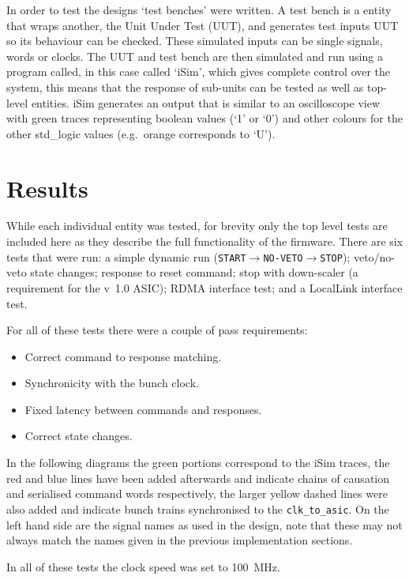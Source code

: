 In order to test the designs `test benches' were written. A test bench is a entity that wraps another, the Unit Under Test (UUT), and generates test inputs UUT so its behaviour can be checked. These simulated inputs can be single signals, words or clocks. The UUT and test bench are then simulated and run using a program called, in this case called `iSim', which gives complete control over the system, this means that the response of sub-units can be tested as well as top-level entities. iSim generates an output that is similar to an oscilloscope view with green traces representing boolean values (`1' or `0') and other colours for the other std\_logic values (e.g.\ orange corresponds to `U'). 

\section{Results} %
\label{sec:results}
While each individual entity was tested, for brevity only the top level tests are included here as they describe the full functionality of the firmware. There are six tests that were run: a simple dynamic run (\texttt{START}\(\rightarrow\)\texttt{NO-VETO}\(\rightarrow\)\texttt{STOP}); veto/no-veto state changes; response to reset command; stop with down-scaler (a requirement for the v~1.0 ASIC); RDMA interface test; and a LocalLink interface test.

For all of these tests there were a couple of pass requirements:
\begin{itemize}
  \item Correct command to response matching.
  \item Synchronicity with the bunch clock.
  \item Fixed latency between commands and responses. 
  \item Correct state changes.
\end{itemize}

In the following diagrams the green portions correspond to the iSim traces, the red and blue lines have been added afterwards and indicate chains of causation and serialised command words respectively, the larger yellow dashed lines were also added and indicate bunch trains synchronised to the \texttt{clk\_to\_asic}. On the left hand side are the signal names as used in the design, note that these may not always match the names given in the previous implementation sections.

In all of these tests the clock speed was set to 100~MHz.

